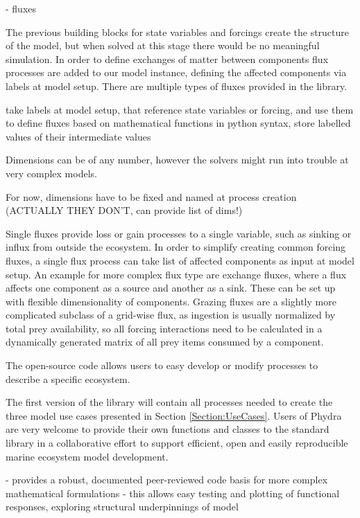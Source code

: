 \documentclass[journal abbreviation, manuscript]{copernicus}
\begin{document}
- fluxes

The previous building blocks for state variables and forcings create the structure of the model, but when solved at this stage there would be no meaningful simulation. In order to define exchanges of matter between components flux processes are added to our model instance, defining the affected components via labels at model setup.
There are multiple types of fluxes provided in the library. 

take labels at model setup, that reference state variables or forcing, and use them to define fluxes based on mathematical functions in python syntax, store labelled values of their intermediate values

Dimensions can be of any number, however the solvers might run into trouble at very complex models. 

For now, dimensions have to be fixed and named at process creation (ACTUALLY THEY DON'T, can provide list of dims!)

Single fluxes provide loss or gain processes to a single variable, such as sinking or influx from outside the ecosystem. In order to simplify creating common forcing fluxes, a single flux process can take list of affected components as input at model setup. An example for more complex flux type are exchange fluxes, where a flux affects one component as a source and another as a sink. These can be set up with flexible dimensionality of components. Grazing fluxes are a slightly more complicated subclass of a grid-wise flux, as ingestion is usually normalized by total prey availability, so all forcing interactions need to be calculated in a dynamically generated matrix of all prey items consumed by a component.


The open-source code allows users to easy develop or modify processes to describe a specific ecosystem.

The first version of the library will contain all processes needed to create the three model use cases presented in Section \ref{Section:UseCases}. Users of Phydra are very welcome to provide their own functions and classes to the standard library in a collaborative effort to support efficient, open and easily reproducible marine ecosystem model development.

- provides a robust, documented peer-reviewed code basis for more complex mathematical formulations
- this allows easy testing and plotting of functional responses, exploring structural underpinnings of model
\end{document}
